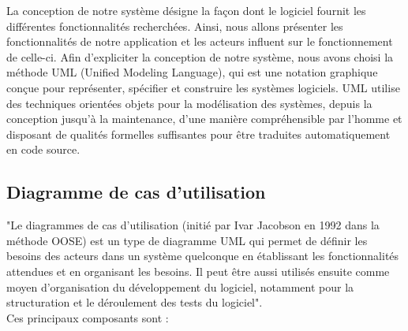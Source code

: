 La conception de notre système désigne la façon dont le logiciel fournit les différentes fonctionnalités recherchées. Ainsi, nous allons présenter les fonctionnalités de notre application et les acteurs influent sur le fonctionnement de celle-ci. Afin d'expliciter la conception de notre système, nous avons choisi la méthode UML (Unified Modeling Language), qui est une notation graphique conçue pour représenter, spécifier et construire les systèmes logiciels. UML utilise des techniques orientées objets pour la modélisation des systèmes, depuis la conception jusqu'à la maintenance, d’une manière compréhensible par l’homme et disposant de qualités formelles suffisantes pour être traduites automatiquement en code source.\cite{uml}

\subsection{Diagramme de cas d'utilisation}
"Le diagrammes de cas d'utilisation (initié par Ivar Jacobson en 1992 dans la méthode OOSE) est un type de diagramme UML qui permet de définir les besoins des acteurs dans un système quelconque en établissant les fonctionnalités attendues et en organisant les besoins. Il peut être aussi utilisés ensuite comme moyen d’organisation du développement du logiciel, notamment pour la structuration et le déroulement des tests du logiciel".\cite{uml}\\

Ces principaux composants sont :

